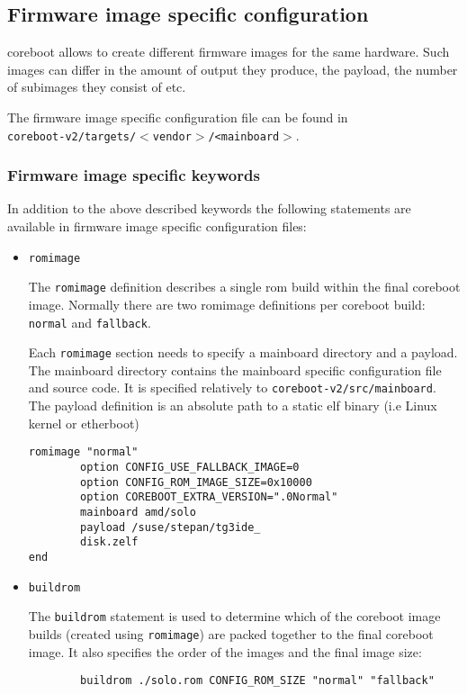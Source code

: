 \documentclass[titlepage,12pt]{article}
\begin{document}
\subsection{Firmware image specific configuration}
coreboot allows to create different firmware images for the same
hardware. Such images can differ in the amount of output they produce,
the payload, the number of subimages they consist of etc.

The firmware image specific configuration file can be found in \\
\texttt{coreboot-v2/targets/$<$vendor$>$/<mainboard$>$}.

\subsubsection{Firmware image specific keywords}
In addition to the above described keywords the following statements are
available in firmware image specific configuration files:

\begin{itemize}
\item \begin{verbatim}romimage\end{verbatim}

The \texttt{romimage} definition describes a single rom build within the
final coreboot image. Normally there are two romimage definitions per
coreboot build: \texttt{normal} and \texttt{fallback}.

Each \texttt{romimage} section needs to specify a mainboard directory and a
payload. The mainboard directory contains the mainboard specific
configuration file and source code. It is specified relatively to
\texttt{coreboot-v2/src/mainboard}. The payload definition is an absolute
path to a static elf binary (i.e Linux kernel or etherboot)

\begin{verbatim}
romimage "normal"
        option CONFIG_USE_FALLBACK_IMAGE=0
        option CONFIG_ROM_IMAGE_SIZE=0x10000
        option COREBOOT_EXTRA_VERSION=".0Normal"
        mainboard amd/solo
        payload /suse/stepan/tg3ide_
        disk.zelf
end
\end{verbatim}

\item \begin{verbatim}buildrom\end{verbatim}

The \texttt{buildrom} statement is used to determine which of the
coreboot image builds (created using \texttt{romimage}) are packed
together to the final coreboot image. It also specifies the order of
the images and the final image size:

\begin{verbatim}
        buildrom ./solo.rom CONFIG_ROM_SIZE "normal" "fallback"
\end{verbatim}

\end{itemize}
\end{document}
